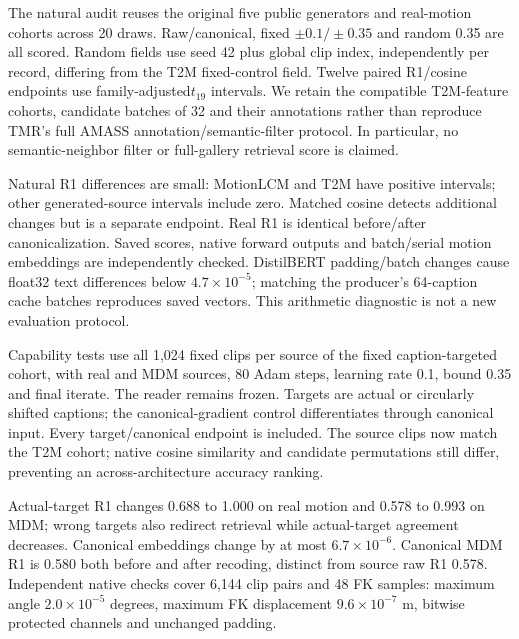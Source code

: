 The natural audit reuses the original five public generators and real-motion cohorts across 20 draws. Raw/canonical, fixed $\pm 0.1/\pm 0.35$ and random 0.35 are all scored. Random fields use seed 42 plus global clip index, independently per record, differing from the T2M fixed-control field. Twelve paired R1/cosine endpoints use family-adjusted$t_{19}$ intervals. We retain the compatible T2M-feature cohorts, candidate batches of 32 and their annotations rather than reproduce TMR's full AMASS annotation/semantic-filter protocol. In particular, no semantic-neighbor filter or full-gallery retrieval score is claimed.

Natural R1 differences are small: MotionLCM and T2M have positive intervals; other generated-source intervals include zero. Matched cosine detects additional changes but is a separate endpoint. Real R1 is identical before/after canonicalization. Saved scores, native forward outputs and batch/serial motion embeddings are independently checked. DistilBERT padding/batch changes cause float32 text differences below $4.7\times 10^{-5}$; matching the producer's 64-caption cache batches reproduces saved vectors. This arithmetic diagnostic is not a new evaluation protocol.


Capability tests use all 1,024 fixed clips per source of the fixed caption-targeted cohort, with real and MDM sources, 80 Adam steps, learning rate 0.1, bound 0.35 and final iterate. The reader remains frozen. Targets are actual or circularly shifted captions; the canonical-gradient control differentiates through canonical input. Every target/canonical endpoint is included. The source clips now match the T2M cohort; native cosine similarity and candidate permutations still differ, preventing an across-architecture accuracy ranking.

Actual-target R1 changes 0.688 to 1.000 on real motion and 0.578 to 0.993 on MDM; wrong targets also redirect retrieval while actual-target agreement decreases. Canonical embeddings change by at most $6.7\times 10^{-6}$. Canonical MDM R1 is 0.580 both before and after recoding, distinct from source raw R1 0.578. Independent native checks cover 6,144 clip pairs and 48 FK samples: maximum angle $2.0\times 10^{-5}$ degrees, maximum FK displacement $9.6\times 10^{-7}$ m, bitwise protected channels and unchanged padding.

